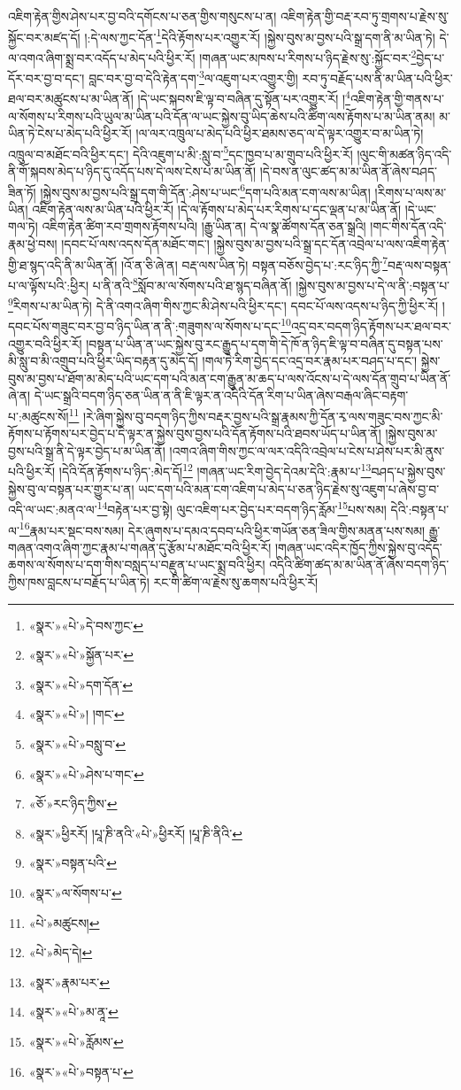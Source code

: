 འཇིག་རྟེན་གྱིས་ཤེས་པར་བྱ་བའི་དགོངས་པ་ཅན་གྱིས་གསུངས་པ་ན། འཇིག་རྟེན་གྱི་བརྡ་རབ་ཏུ་གྲགས་པ་རྗེས་སུ་སྐྱོང་བར་མཛད་དོ། །:དེ་ལས་ཀྱང་དོན་\footnote{«སྣར་»«པེ་»དེ་བས་ཀྱང་}དེའི་རྟོགས་པར་འགྱུར་རོ། །སྐྱེས་བུས་མ་བྱས་པའི་སྒྲ་དག་ནི་མ་ཡིན་ཏེ། དེ་ལ་འགའ་ཞིག་སྨྲ་བར་འདོད་པ་མེད་པའི་ཕྱིར་རོ། །གཞན་ཡང་མཁས་པ་རིགས་པ་ཉིད་རྗེས་སུ་:སྐྱོང་བར་\footnote{«སྣར་»«པེ་»སྐྱོན་པར་}བྱེད་པ་དོར་བར་བྱ་བ་དང་། བླང་བར་བྱ་བ་དེའི་རྟེན་དག་\footnote{«སྣར་»«པེ་»དག་དོན་}ལ་འཇུག་པར་འགྱུར་གྱི། རབ་ཏུ་བརྗོད་པས་ནི་མ་ཡིན་པའི་ཕྱིར་ཐལ་བར་མཚུངས་པ་མ་ཡིན་ནོ། །དེ་ཡང་སྐབས་ཇི་ལྟ་བ་བཞིན་དུ་སྟོན་པར་འགྱུར་རོ། །\footnote{«སྣར་»«པེ་»། །གང་}འཇིག་རྟེན་གྱི་གནས་པ་ལ་སོགས་པ་རིགས་པའི་ཡུལ་མ་ཡིན་པའི་དོན་ལ་ཡང་སྐྱེས་བུ་ཡིད་ཆེས་པའི་ཚིག་ལས་རྟོགས་པ་མ་ཡིན་ནམ། མ་ཡིན་ཏེ་ངེས་པ་མེད་པའི་ཕྱིར་རོ། །ལ་ལར་འཁྲུལ་པ་མེད་པའི་ཕྱིར་ཐམས་ཅད་ལ་དེ་ལྟར་འགྱུར་བ་མ་ཡིན་ཏེ། འཁྲུལ་བ་མཐོང་བའི་ཕྱིར་དང་། དེའི་འཇུག་པ་མི་:སླུ་བ་\footnote{«སྣར་»«པེ་»བསླུ་བ་}དང་ཁྱབ་པ་མ་གྲུབ་པའི་ཕྱིར་རོ། །ལུང་གི་མཚན་ཉིད་འདི་ནི་གོ་སྐབས་མེད་པ་ཉིད་དུ་འདོད་པས་དེ་ལས་ངེས་པ་མ་ཡིན་ནོ། །དེ་བས་ན་ལུང་ཚད་མ་མ་ཡིན་ནོ་ཞེས་བཤད་ཟིན་ཏོ། །སྐྱེས་བུས་མ་བྱས་པའི་སྒྲ་དག་གི་དོན་:ཤེས་པ་ཡང་\footnote{«སྣར་»«པེ་»ཤེས་པ་གང་}དག་པའི་མན་ངག་ལས་མ་ཡིན། །རིགས་པ་ལས་མ་ཡིན། འཇིག་རྟེན་ལས་མ་ཡིན་པའི་ཕྱིར་རོ། །དེ་ལ་རྟོགས་པ་མེད་པར་རིགས་པ་དང་ལྡན་པ་མ་ཡིན་ནོ། །དེ་ཡང་གལ་ཏེ། འཇིག་རྟེན་ཚིག་རབ་གྲགས་རྟོགས་པའི། །རྒྱུ་ཡིན་ན། དེ་ལ་སྣ་ཚོགས་དོན་ཅན་སྒྲའི། །གང་གིས་དོན་འདི་རྣམ་ཕྱེ་བས། །དབང་པོ་ལས་འདས་དོན་མཐོང་གང་། །སྐྱེས་བུས་མ་བྱས་པའི་སྒྲ་དང་དོན་འབྲེལ་པ་ལས་འཇིག་རྟེན་གྱི་ཐ་སྙད་འདི་ནི་མ་ཡིན་ནོ། །འོ་ན་ཅི་ཞེ་ན། བརྡ་ལས་ཡིན་ཏེ། བསྟན་བཅོས་བྱེད་པ་:རང་ཉིད་ཀྱི་\footnote{«ཅོ་»རང་ཉིད་ཀྱིས་}བརྡ་ལས་བསྟན་པ་ལ་ལྟོས་པའི་:ཕྱིར། པ་ནི་ནའི་\footnote{«སྣར་»ཕྱིརརོ། །པཱ་ཎི་ནའི་«པེ་»ཕྱིརརོ། །པཱ་ཎི་ནིའི་}སློབ་མ་ལ་སོགས་པའི་ཐ་སྙད་བཞིན་ནོ། །སྐྱེས་བུས་མ་བྱས་པ་དེ་ལ་ནི་:བསྟན་པ་\footnote{«སྣར་»བསྟན་པའི་}རིགས་པ་མ་ཡིན་ཏེ། དེ་ནི་འགའ་ཞིག་གིས་ཀྱང་མི་ཤེས་པའི་ཕྱིར་དང་། དབང་པོ་ལས་འདས་པ་ཉིད་ཀྱི་ཕྱིར་རོ། །དབང་པོས་གཟུང་བར་བྱ་བ་ཉིད་ཡིན་ན་ནི་:གཟུགས་ལ་སོགས་པ་དང་\footnote{«སྣར་»ལ་སོགས་པ་}འདྲ་བར་བདག་ཉིད་རྟོགས་པར་ཐལ་བར་འགྱུར་བའི་ཕྱིར་རོ། །བསྟན་པ་ཡིན་ན་ཡང་སྐྱེས་བུ་རང་རྒྱུད་པ་དག་གི་དེ་ཁོ་ན་ཉིད་ཇི་ལྟ་བ་བཞིན་དུ་བསྟན་པས་མི་སླུ་བ་མི་འགྲུབ་པའི་ཕྱིར་ཡིད་བརྟན་དུ་མེད་དོ། །གལ་ཏེ་རིག་བྱེད་དང་འདྲ་བར་རྣམ་པར་བཤད་པ་དང་། སྐྱེས་བུས་མ་བྱས་པ་ཐོག་མ་མེད་པའི་ཡང་དག་པའི་མན་ངག་རྒྱུན་མ་ཆད་པ་ལས་འོངས་པ་དེ་ལས་དོན་གྲུབ་པ་ཡིན་ནོ་ཞེ་ན། དེ་ཡང་སྒྲའི་བདག་ཉིད་ཅན་ཡིན་ན་ནི་ཇི་ལྟར་ན་འདིའི་དོན་རིག་པ་ཡིན་ཞེས་བརྒལ་ཞིང་བརྟག་པ་:མཚུངས་སོ།\footnote{«པེ་»མཚུངས།} །རེ་ཞིག་སྐྱེས་བུ་བདག་ཉིད་ཀྱིས་བརྡར་བྱས་པའི་སྒྲ་རྣམས་ཀྱི་དོན་རྭ་ལས་གཟུང་བས་ཀྱང་མི་རྟོགས་པ་རྟོགས་པར་བྱེད་པ་དེ་ལྟར་ན་སྐྱེས་བུས་བྱས་པའི་དོན་རྟོགས་པའི་ཐབས་ཡོད་པ་ཡིན་ནོ། །སྐྱེས་བུས་མ་བྱས་པའི་སྒྲ་ནི་དེ་ལྟར་བྱེད་པ་མ་ཡིན་ནོ། །འགའ་ཞིག་གིས་ཀྱང་ལ་ལར་འདིའི་འབྲེལ་པ་ངེས་པ་ཤེས་པར་མི་ནུས་པའི་ཕྱིར་རོ། །དེའི་དོན་རྟོགས་པ་ཉིད་:མེད་དོ།\footnote{«པེ་»མེད་དེ།} །གཞན་ཡང་རིག་བྱེད་དེའམ་དེའི་:རྣམ་པ་\footnote{«སྣར་»རྣམ་པར་}བཤད་པ་སྐྱེས་བུས་སྐྱེས་བུ་ལ་བསྟན་པར་གྱུར་པ་ན། ཡང་དག་པའི་མན་ངག་འཇིག་པ་མེད་པ་ཅན་ཉིད་རྗེས་སུ་འཇུག་པ་ཞེས་བྱ་བ་འདི་ལ་ཡང་:མནའ་ལ་\footnote{«སྣར་»«པེ་»མ་ནཱ་}བརྟེན་པར་བྱ་སྟེ། ལུང་འཇིག་པར་བྱེད་པར་བདག་ཉིད་རློམ་\footnote{«སྣར་»«པེ་»རློམས་}པས་སམ། དེའི་:བསྟན་པ་ལ་\footnote{«སྣར་»«པེ་»བསྟན་པ་}རྣམ་པར་སྡང་བས་སམ། དེར་ཞུགས་པ་དམའ་དབབ་པའི་ཕྱིར་གཡོན་ཅན་ཟིལ་གྱིས་མནན་པས་སམ། རྒྱུ་གཞན་འགའ་ཞིག་ཀྱང་རྣམ་པ་གཞན་དུ་རྩོམ་པ་མཐོང་བའི་ཕྱིར་རོ། །གཞན་ཡང་འདིར་ཁྱོད་ཀྱིས་སྐྱེས་བུ་འདོད་ཆགས་ལ་སོགས་པ་དག་གིས་བསླད་པ་བརྫུན་པ་ཡང་སྨྲ་བའི་ཕྱིར། འདིའི་ཚིག་ཚད་མ་མ་ཡིན་ནོ་ཞེས་བདག་ཉིད་ཀྱིས་ཁས་བླངས་པ་བརྗོད་པ་ཡིན་ཏེ། རང་གི་ཚིག་ལ་རྗེས་སུ་ཆགས་པའི་ཕྱིར་རོ། 